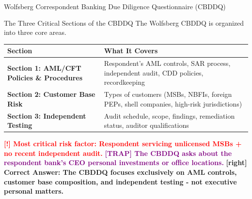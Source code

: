 \documentclass[11pt,a4paper]{beamer}
\newcommand{\redflag}[1]{\textcolor{red}{\textbf{[!] #1}}}
\newcommand{\trap}[1]{\textcolor{purple}{\textbf{[TRAP] #1}}}
\newcommand{\correct}[1]{\textcolor{green!50!black}{\textbf{[right] #1}}}
\begin{document}

\begin{frame}{Wolfsberg Correspondent Banking Due Diligence Questionnaire (CBDDQ)}
\begin{block}{The Three Critical Sections of the CBDDQ}
The Wolfsberg CBDDQ is organized into three core areas.
\end{block}
\begin{tabular}{p{}|p{}}
\hline
\rowcolor{lightgray}
\textbf{Section} & \textbf{What It Covers} \\
\hline
\textbf{Section 1: AML/CFT Policies \& Procedures} & Respondent's AML controls, SAR process, independent audit, CDD policies, recordkeeping \\
\hline
\textbf{Section 2: Customer Base Risk} & Types of customers (MSBs, NBFIs, foreign PEPs, shell companies, high-risk jurisdictions) \\
\hline
\textbf{Section 3: Independent Testing} & Audit schedule, scope, findings, remediation status, auditor qualifications \\
\hline
\end{tabular}
\redflag{Most critical risk factor: Respondent servicing unlicensed MSBs + no recent independent audit.}
\trap{The CBDDQ asks about the respondent bank's CEO personal investments or office locations.}
\correct{Correct Answer: The CBDDQ focuses exclusively on AML controls, customer base composition, and independent testing - not executive personal matters.}
\end{frame}

\end{document}
